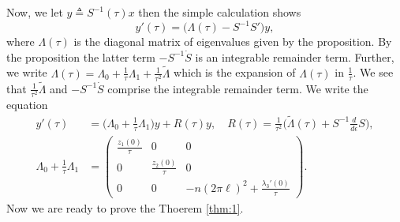 \documentclass[a4paper,11pt]{article}
\def\l{(2\pi \ell)}
\theoremstyle{remark}
\begin{document}
Now, we let $y\triangleq S^{-1}(\tau)x$ then the simple calculation shows
$$ y'(\tau) = \Big(\Lambda(\tau) - S^{-1}S'\Big) y,$$
where $\Lambda(\tau)$ is the diagonal matrix of eigenvalues given by the proposition. By the proposition the latter term $- S^{-1}\dot{S}$ is an integrable remainder term. Further, we write $\Lambda(\tau) = \Lambda_0 + \frac{1}{\tau}\Lambda_1 + \frac{1}{\tau^2}\tilde{\Lambda}$ which is the expansion of $\Lambda(\tau)$ in $\frac{1}{\tau}$. We see that $\frac{1}{\tau^2}\tilde{\Lambda}$ and $- S^{-1}\dot{S}$ comprise the integrable remainder term. We write the equation
\begin{align}
y'(\tau) &= \Big(\Lambda_0 + \frac{1}{\tau}\Lambda_1\Big) y + R(\tau) y, \quad R(\tau) = \frac{1}{\tau^2}\Big(\tilde{\Lambda}(\tau)+ S^{-1}\frac{d}{d\epsilon}{S}\Big), \label{eq:diagonalsystem} \\
 \Lambda_0 + \frac{1}{\tau}\Lambda_1 &=
 \begin{pmatrix}
  \frac{z_1(0)}{\tau} & 0 & 0\\
  0 & \frac{z_2(0)}{\tau} & 0\\
  0 & 0 & -n\l^2 + \frac{\lambda_3'(0)}{\tau} \label{eq:order1diag}
 \end{pmatrix}.
\end{align}
Now we are ready to prove the Thoerem \ref{thm:1}.
\end{document}

